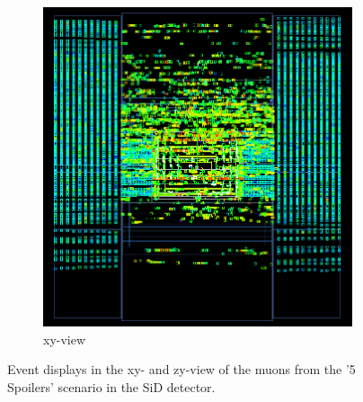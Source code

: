 \begin{figure}
\begin{subfigure}[b]{0.49\textwidth}
        \includegraphics[height=0.3\textheight]{figures/muons_positron_5spoilers_wall_515_zyview_croped.png}
        \caption{xy-view}
        \label{fig:zy_5Spoilers}
    \end{subfigure}
    \caption[Event displays of muons in SiD from the '5 Spoilers' scenario]{
    Event displays in the xy- and zy-view of the muons from the '5 Spoilers' scenario in the SiD detector.
    }
    \label{fig:WIRED4_5Spoilers}
\end{figure}

